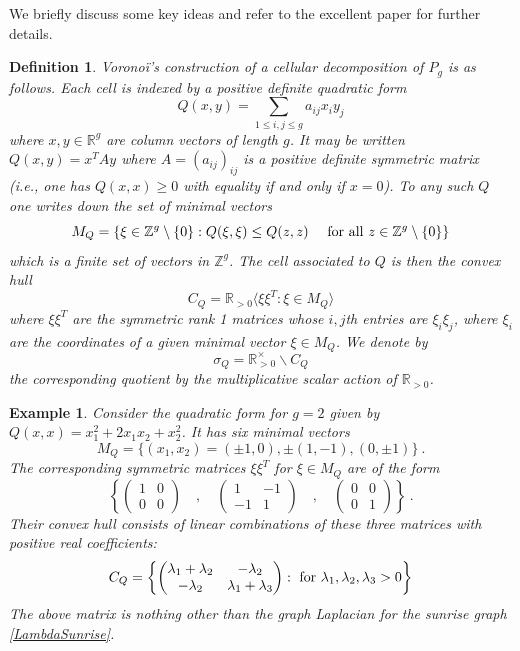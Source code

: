 \documentclass[12pt]{amsart}
\newcommand{\RR}{{\mathbb R}}
\newcommand{\ZZ}{{\mathbb Z}}
\theoremstyle{plain}
\newtheorem{defn}[thm]{Definition}
\newtheorem{ex}[thm]{Example}
\newcommand{\0}{\color{blue}{\mathsf{0}}}
\begin{document}
 We briefly discuss some key ideas  and refer to the excellent paper \cite{TopWeightAg} for further details.
 
 \begin{defn} Vorono\"i's construction of a cellular decomposition of $P_g$ is as follows. Each cell is indexed by a positive definite quadratic form 
 \[ Q(x,y)  =  \sum_{1\leq i,j\leq g} a_{ij} x_i y_j  \]
 where $x, y\in \RR^g$ are column vectors of length $g$. It may be written $Q(x,y) = x^T A y$ where $A=(a_{ij})_{ij}$ is a positive definite symmetric matrix (i.e., 
 one has $Q(x,x) \geq 0$ with equality if and only if $x=0$).  To any such $Q$ one writes down the set of minimal vectors
 \[ M_{Q} = \{ \xi \in \ZZ^g \setminus \{0\}:  Q(\xi, \xi) \leq  Q(z, z) \quad  \hbox{ for all } z \in \ZZ^g\setminus \{0\} \}\]
 which is a finite set of vectors in $\ZZ^g$. The cell associated to $Q$ is then the convex hull 
 \[ C_{Q} =  \RR_{>0}  \langle \xi \xi^T : \xi \in M_{Q} \rangle\]
 where $\xi \xi^T$ are the symmetric rank 1 matrices whose $i,j$th entries are $\xi_i\xi_j$, where $\xi_i$ are the coordinates of a given minimal vector $\xi\in M_Q$.
 We denote by 
 \[ \sigma_Q = \RR^{\times}_{>0} \backslash C_Q\]
 the corresponding quotient by the multiplicative scalar action of $\RR_{>0}$. 
  \end{defn} 
 \begin{ex} Consider the quadratic form for $g=2$ given by $Q(x,x) = x^2_1+2x_1x_2 + x_2^2$. 
 It has six    minimal vectors 
 \[  M_{Q} =  \{ (x_1,x_2) =   ( \pm 1, 0)  ,   \pm (1,-1)  ,  (0, \pm 1) \} \ .\]
 The corresponding symmetric matrices $\xi\xi^T$ for $\xi \in M_{Q}$ are of the form
 \[  \left\{  \begin{pmatrix}  1 & 0 \\ 0 & 0 \end{pmatrix} \quad , \quad  \begin{pmatrix} 1 & -1 \\ -1 & 1 \end{pmatrix}  \quad , \quad    \begin{pmatrix}  0 & 0 \\ 0 & 1 \end{pmatrix}
  \right\}\ . \]
 Their convex hull consists of linear combinations of these three matrices with positive real coefficients:
\[ C_{Q} = \left\{  \begin{pmatrix}  \lambda_1+\lambda_2 & -\lambda_2 \\  -\lambda_{2}  & \lambda_1+\lambda_3 \end{pmatrix} : \hbox{ for } \lambda_1,\lambda_2,\lambda_3>0    \right\} \] 
The above matrix is nothing other than the graph Laplacian for the sunrise graph 
\eqref{LambdaSunrise}.

 \end{ex}
\end{document}
